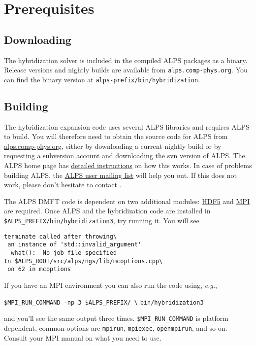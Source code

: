 \documentclass[aps,prb,floatfix,superscriptaddress,twocolumn,notitlepage]{revtex4-1}
\begin{document}
\section{Prerequisites}
\subsection{Downloading}
The hybridization solver is included in the compiled ALPS packages as a binary. Release versions and nightly builds are available from \verb#alps.comp-phys.org#. You can find the binary version at \verb#alps-prefix#\verb#/bin#\verb#/hybridization#.
\subsection{Building}
The hybridization expansion code uses several ALPS libraries\cite{ALPS20} and requires ALPS to build. You will therefore need to obtain the source code for ALPS from \href{http://alps.comp-phys.org}{alps.comp-phys.org}, either by downloading a current nightly build or by requesting a subversion account and downloading the svn version of ALPS. The ALPS home page has \href{http://alps.comp-phys.org/mediawiki/index.php/Download_and_install_ALPS_2}{detailed instructions} on how this works. In case of problems building ALPS, the \href{mailto:comp-phys-alps-users@lists.phys.ethz.ch}{ALPS user mailing list} will help you out. If this does not work, please don't hesitate to  contact \Emanuel.

The ALPS DMFT code is dependent on two additional modules: \href{http://www.hdfgroup.org/}{HDF5} and \href{http://www.openmpi.org}{MPI} are required.
Once ALPS and the hybridization code are installed in \verb#$ALPS_PREFIX/#\verb#bin/#\verb#hybridization3#, try running it. You will see
\begin{verbatim}
terminate called after throwing\
 an instance of 'std::invalid_argument'
  what():  No job file specified
In $ALPS_ROOT/src/alps/ngs/lib/mcoptions.cpp\
 on 62 in mcoptions
\end{verbatim}

If you have an MPI environment you can also run the code using, {\it e.g.},

\verb#$MPI_RUN_COMMAND -np 3 $ALPS_PREFIX/ \#
\verb#bin/hybridization3#

and you'll see the same output three times. \verb#$MPI_RUN_COMMAND# is platform dependent, common options are \verb#mpirun#, \verb#mpiexec#, \verb#openmpirun#, and so on. Consult your MPI manual on what you need to use.
\end{document}
